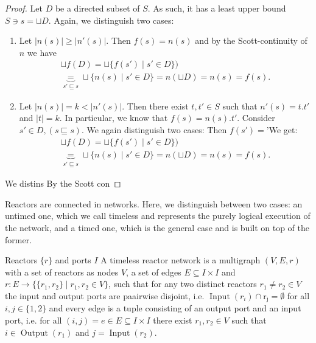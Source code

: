 \begin{lem}
\begin{proof}
        
        Let $D$ be a directed subset of $S$.
        As such, it has a least upper bound $S \ni s = \sqcup D$. Again, we distinguish two cases:
        \begin{enumerate}
        \item Let $|n(s)| \geq  |n'(s)|$. Then $f(s) = n(s)$ and by the Scott-continuity of $n$ we have
         \begin{align*}
             \sqcup f(D) = \sqcup \{ f(s') \mid s' \in D \})  \\ 
             \underbrace{=}_{s' \sqsubseteq s} \sqcup \{ n(s) \mid s' \in D\} = n(\sqcup D) = n(s) = f(s).
             \end{align*}
        \item Let $|n(s)| = k < |n'(s)|$. Then there exist $t,t' \in S$ such that $n'(s) = t.t'$ and $|t| = k.$
        In particular, we know that $f(s) = n(s).t'$.
        Consider $s' \in D, (s \sqsubseteq s)$. We again distinguish two cases:
        Then $f(s') = $'We get: 
         \begin{align*}
             \sqcup f(D) = \sqcup \{ f(s') \mid s' \in D \})  \\ 
             \underbrace{=}_{s' \sqsubseteq s} \sqcup \{ n(s) \mid s' \in D\} = n(\sqcup D) = n(s) = f(s).
             \end{align*}

        \end{enumerate}
        We distins
        By the Scott con

    \end{proof}
\end{lem}
Reactors are connected in networks.
Here, we distinguish between two cases: an untimed one, which we call timeless and represents the purely logical execution of the network, and a timed one, which is the general case and is built on top of the former.
\begin{defn}
    \label{defn:timeless_network}
    Reactors $\{ r \}$ and ports $I$
A timeless reactor network is a multigraph $(V,E,r)$ with a set of reactors as nodes $V$,
a set of edges $E \subseteq I \times I$ and $r : E \rightarrow \{ \{r_1, r_2\} \mid r_1, r_2 \in V \}$,
such that for any two distinct reactors $r_1 \neq r_2 \in V$ the input and output ports are paairwise disjoint,
i.e. $\operatorname{Input}(r_i) \cap \operatorname{r_j} = \emptyset$ for all $i,j \in \{ 1, 2 \}$ and every edge is a tuple consisting of an output port and an input port,
i.e. for all $(i,j) = e \in E \subseteq I \times I$ there exist $r_1,r_2 \in V$ such that $i \in \operatorname{Output}(r_1)$ and $j = \operatorname{Input}(r_2)$.
\end{defn}

